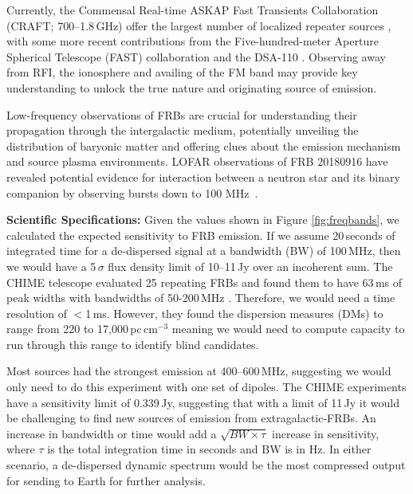 Currently, the Commensal Real-time ASKAP Fast Transients Collaboration (CRAFT; 700--1.8\,GHz) offer the largest number of localized repeater sources \citep{shannon2024ics, SD_2023}, with some more recent contributions from the Five-hundred-meter Aperture Spherical Telescope (FAST) collaboration \citep[1.00--1.45\,GHz;][]{ZX_2023} and the DSA-110 \citep{LC_2023,sharma2024preferential}. Observing away from RFI, the ionosphere and availing of the FM band may provide key understanding to unlock the true nature and originating source of emission.

Low-frequency observations of FRBs are crucial for understanding their propagation through the intergalactic medium, potentially unveiling the distribution of baryonic matter and offering clues about the emission mechanism and source plasma environments. LOFAR observations of FRB 20180916 have revealed potential evidence for interaction between a neutron star and its binary companion by observing bursts down to 100 MHz~\citep{pleunis2021lofar}.

\textbf{Scientific Specifications:} Given the values shown in Figure \ref{fig:freqbands}, we calculated the expected sensitivity to FRB emission. If we assume 20\,seconds of integrated time for a de-dispersed signal at a bandwidth (BW) of 100\,MHz, then we would have a 5\,$\sigma$ flux density limit of 10--11\,Jy over an incoherent sum. The CHIME telescope evaluated 25 repeating FRBs and found them to have 63\,ms of peak widths with bandwidths of 50-200\,MHz \citep{CHIME_RepeatingFRB}. Therefore, we would need a time resolution of $<$1\,ms. However, they found the dispersion measures (DMs) to range from 220 to 17,000\,pc\,cm$^{-3}$ meaning we would need to compute capacity to run through this range to identify blind candidates. 

Most sources had the strongest emission at 400--600\,MHz, suggesting we would only need to do this experiment with one set of dipoles. The CHIME experiments have a sensitivity limit of 0.339\,Jy, suggesting that with a limit of 11\,Jy it would be challenging to find new sources of emission from extragalactic-FRBs. An increase in bandwidth or time would add a $\sqrt{BW\times\tau}$ increase in sensitivity, where $\tau$ is the total integration time in seconds and BW is in Hz. In either scenario, a de-dispersed dynamic spectrum would be the most compressed output for sending to Earth for further analysis.




